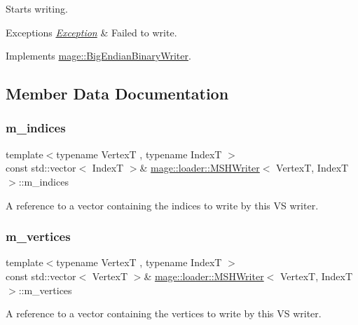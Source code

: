 Starts writing.


\begin{DoxyExceptions}{Exceptions}
{\em \hyperlink{classmage_1_1_exception}{Exception}} & Failed to write. \\
\hline
\end{DoxyExceptions}


Implements \hyperlink{classmage_1_1_big_endian_binary_writer_a719581274b1b185ef05687183f7ded25}{mage\+::\+Big\+Endian\+Binary\+Writer}.



\subsection{Member Data Documentation}
\hypertarget{classmage_1_1loader_1_1_m_s_h_writer_a1775d9f0ff180f40ee7964ff98226a41}{}\label{classmage_1_1loader_1_1_m_s_h_writer_a1775d9f0ff180f40ee7964ff98226a41} 
\subsubsection{\texorpdfstring{m\+\_\+indices}{m\_indices}}
{\footnotesize\ttfamily template$<$typename VertexT , typename IndexT $>$ \\
const std\+::vector$<$ IndexT $>$\& \hyperlink{classmage_1_1loader_1_1_m_s_h_writer}{mage\+::loader\+::\+M\+S\+H\+Writer}$<$ VertexT, IndexT $>$\+::m\+\_\+indices\hspace{0.3cm}{\ttfamily [private]}}

A reference to a vector containing the indices to write by this VS writer. \hypertarget{classmage_1_1loader_1_1_m_s_h_writer_a2d7b69d324cbcdf12ad80b739effc548}{}\label{classmage_1_1loader_1_1_m_s_h_writer_a2d7b69d324cbcdf12ad80b739effc548} 
\subsubsection{\texorpdfstring{m\+\_\+vertices}{m\_vertices}}
{\footnotesize\ttfamily template$<$typename VertexT , typename IndexT $>$ \\
const std\+::vector$<$ VertexT $>$\& \hyperlink{classmage_1_1loader_1_1_m_s_h_writer}{mage\+::loader\+::\+M\+S\+H\+Writer}$<$ VertexT, IndexT $>$\+::m\+\_\+vertices\hspace{0.3cm}{\ttfamily [private]}}

A reference to a vector containing the vertices to write by this VS writer. 